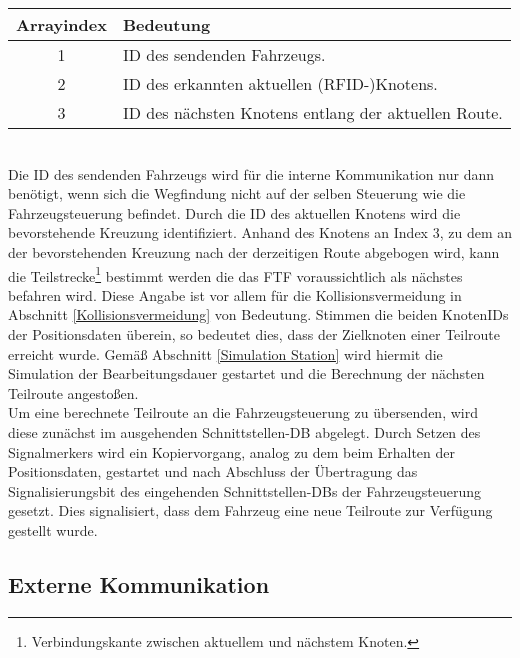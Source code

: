 		\begin{tabular}{| c | l |}
			\hline
			\textbf{Arrayindex} & \textbf{Bedeutung} \\ \hline \hline
			1 & ID des sendenden Fahrzeugs. \\ \hline
			2 & ID des erkannten aktuellen (RFID-)Knotens. \\ \hline
			3 & ID des nächsten Knotens entlang der aktuellen Route. \\
			\hline
		\end{tabular}\\
		
		Die ID des sendenden Fahrzeugs wird für die interne Kommunikation nur dann benötigt, wenn sich die Wegfindung nicht auf der selben Steuerung wie die Fahrzeugsteuerung befindet. Durch die ID des aktuellen Knotens wird die bevorstehende Kreuzung identifiziert. Anhand des Knotens an Index 3, zu dem an der bevorstehenden Kreuzung nach der derzeitigen Route abgebogen wird, kann die Teilstrecke\footnote{Verbindungskante zwischen aktuellem und nächstem Knoten.} bestimmt werden die das \ac{FTF} voraussichtlich als nächstes befahren wird. Diese Angabe ist vor allem für die Kollisionsvermeidung in Abschnitt \ref{Kollisionsvermeidung} von Bedeutung. Stimmen die beiden KnotenIDs der Positionsdaten überein, so bedeutet dies, dass der Zielknoten einer Teilroute erreicht wurde. Gemäß Abschnitt \ref{Simulation Station} wird hiermit die Simulation der Bearbeitungsdauer gestartet und die Berechnung der nächsten Teilroute angestoßen.
		\\
		Um eine berechnete Teilroute an die Fahrzeugsteuerung zu übersenden, wird diese zunächst im ausgehenden Schnittstellen-\ac{DB} abgelegt. Durch Setzen des Signalmerkers wird ein Kopiervorgang, analog zu dem beim Erhalten der Positionsdaten, gestartet und nach Abschluss der Übertragung das Signalisierungsbit des eingehenden Schnittstellen-{DB}s der Fahrzeugsteuerung gesetzt. Dies signalisiert, dass  dem Fahrzeug eine neue Teilroute zur Verfügung gestellt wurde.
				
	\subsection{Externe Kommunikation}
	
